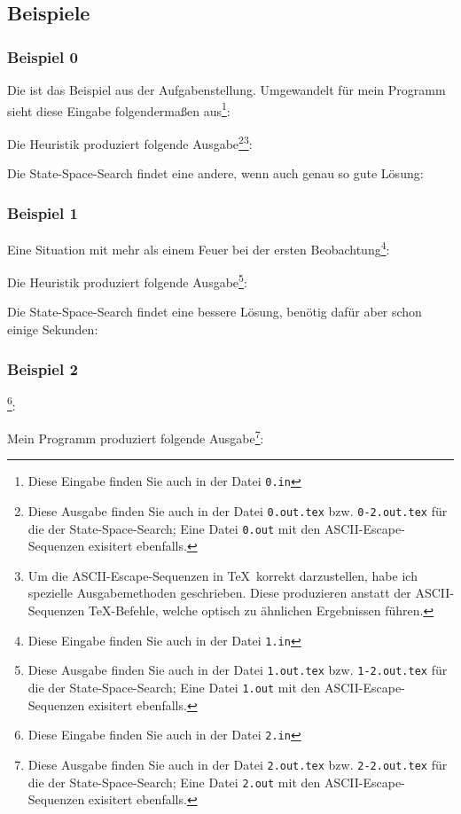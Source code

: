\subsection{Beispiele}
\subsubsection*{Beispiel 0}
Die ist das Beispiel aus der Aufgabenstellung. Umgewandelt für mein Programm sieht diese Eingabe folgendermaßen aus\footnote{Diese Eingabe finden Sie auch in der Datei \texttt{0.in}}:
{\small

}
Die Heuristik produziert folgende Ausgabe\footnote{Diese Ausgabe finden Sie auch in der Datei \texttt{0.out.tex} bzw. \texttt{0-2.out.tex} für die der State-Space-Search; Eine Datei \texttt{0.out} mit den ASCII-Escape-Sequenzen exisitert ebenfalls.}\footnote{Um die ASCII-Escape-Sequenzen in \TeX\, korrekt darzustellen, habe ich spezielle Ausgabemethoden geschrieben. Diese produzieren anstatt der ASCII-Sequenzen \TeX -Befehle, welche optisch zu ähnlichen Ergebnissen führen.}:\\
{\ttfamily \small

}

Die State-Space-Search findet eine andere, wenn auch genau so gute Lösung:\\

{\ttfamily \small

}

\subsubsection*{Beispiel 1}
Eine Situation mit mehr als einem Feuer bei der ersten Beobachtung\footnote{Diese Eingabe finden Sie auch in der Datei \texttt{1.in}}:
{\small

}
Die Heuristik produziert folgende Ausgabe\footnote{Diese Ausgabe finden Sie auch in der Datei \texttt{1.out.tex} bzw. \texttt{1-2.out.tex} für die der State-Space-Search; Eine Datei \texttt{1.out} mit den ASCII-Escape-Sequenzen exisitert ebenfalls.}:\\
{\ttfamily \small

}

Die State-Space-Search findet eine bessere Lösung, benötig dafür aber schon einige Sekunden:

{\ttfamily \small

}
\subsubsection*{Beispiel 2}
\footnote{Diese Eingabe finden Sie auch in der Datei \texttt{2.in}}:
{\small

}
Mein Programm produziert folgende Ausgabe\footnote{Diese Ausgabe finden Sie auch in der Datei \texttt{2.out.tex} bzw. \texttt{2-2.out.tex} für die der State-Space-Search; Eine Datei \texttt{2.out} mit den ASCII-Escape-Sequenzen exisitert ebenfalls.}:\\
{\ttfamily \small

}

